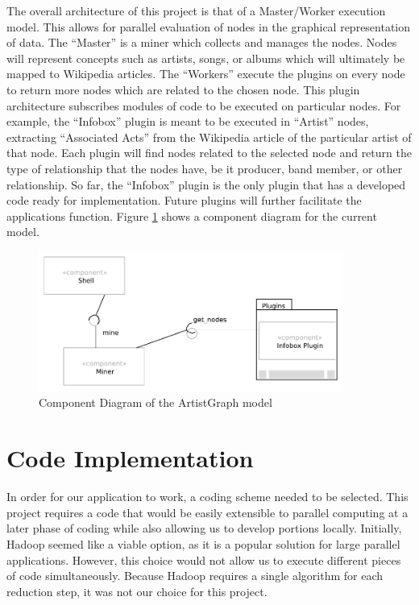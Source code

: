 \documentclass{sig-alternate}
\begin{document}
The overall architecture of this project is that of a Master/Worker execution model\cite{Garg:2001:TOA:558986}.
This allows for parallel evaluation of nodes in the graphical representation of data. 
The ``Master'' is a miner which collects and manages the nodes. Nodes will represent 
concepts such as artists, songs, or albums which will ultimately be mapped to Wikipedia 
articles. The ``Workers'' execute the plugins on every node to return more nodes which are 
related to the chosen node. This plugin architecture subscribes modules of code to be 
executed on particular nodes. For example, the ``Infobox'' plugin is meant to be executed 
in ``Artist'' nodes, extracting ``Associated Acts'' from the Wikipedia article of the particular 
artist of that node. Each plugin will find nodes related to the selected node and return 
the type of relationship that the nodes have, be it producer, band member, or other relationship. 
So far, the ``Infobox'' plugin is the only plugin that has a developed code ready for implementation. 
Future plugins will further facilitate the applications function. Figure \ref{componentdiagram}
shows a component diagram for the current model.

\begin{figure}[ht!]
\centering
\includegraphics[width=10cm]{ArtistGraph_Architecture.PDF}
\caption{Component Diagram of the ArtistGraph model}
\label{componentdiagram}
\end{figure}

\section{Code Implementation}
\label{code implementation}

In order for our application to work, a coding scheme needed to be selected. This project 
requires a code that would be easily extensible to parallel computing at a later phase of 
coding while also allowing us to develop portions locally. Initially, Hadoop seemed like 
a viable option, as it is a popular solution for large parallel applications. However, 
this choice would not allow us to execute different pieces of code simultaneously. Because 
Hadoop requires a single algorithm for each reduction step, it was not our choice for this project. 
\end{document}

